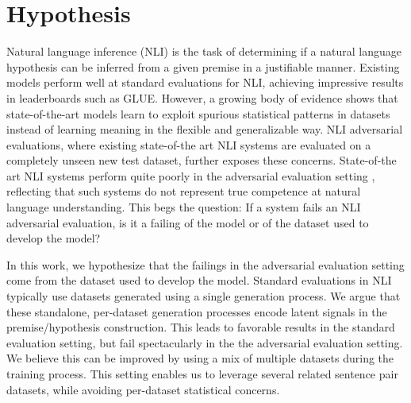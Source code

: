 \section{Hypothesis}
\label{sec:hypothesis}


Natural language inference (NLI) is the task of determining if a natural language hypothesis can be inferred from a given premise in a justifiable manner. Existing models perform well at standard evaluations for NLI, achieving impressive results in leaderboards such as GLUE. However, a growing body of evidence \cite{mccoy2019right, glockner2018breaking} shows that state-of-the-art models learn to exploit spurious statistical patterns in datasets instead of learning meaning in the flexible and generalizable way. NLI adversarial evaluations, where existing state-of-the art NLI systems are evaluated on a completely unseen new test dataset, further exposes these concerns. State-of-the art NLI systems perform quite poorly in the adversarial evaluation setting \cite{nie2019adversarial}, reflecting that such systems do not represent true competence at natural language understanding. This begs the question: If a system fails an NLI adversarial evaluation, is it a failing of the model or of the dataset used to develop the model?

In this work, we hypothesize that the failings in the adversarial evaluation setting come from the dataset used to develop the model. Standard evaluations in NLI typically use datasets generated using a single generation process. We argue that these standalone, per-dataset generation processes encode latent signals in the premise/hypothesis construction. This leads to favorable results in the standard evaluation setting, but fail spectacularly in the the adversarial evaluation setting. We believe this can be improved by using a mix of multiple datasets during the training process. This setting enables us to leverage several related sentence pair datasets, while avoiding per-dataset statistical concerns.


  




